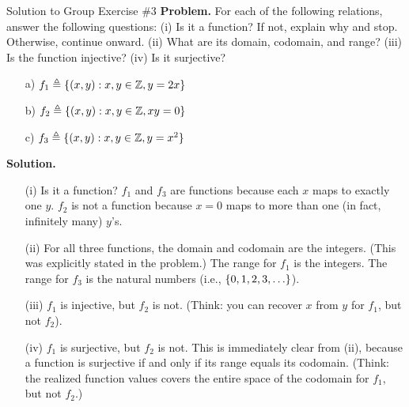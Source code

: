 \documentclass[10pt]{beamer}
\begin{document}
\begin{frame}{Solution to Group Exercise \#3}
\footnotesize 
\textbf{Problem.} For each of the following relations, answer the following questions:
	(i) Is it a function? If not, explain why and stop. Otherwise, continue onward.
	(ii) What are its domain, codomain, and range?
	(iii) Is the function injective? 
	(iv) Is it surjective?
	\begin{itemize}
	\item[a)] $f_1 \triangleq \{ {(x,y): x,y \in \mathbb{Z}, y=2x} \}$
	\item[b)] $f_2 \triangleq \{ {(x,y): x,y \in \mathbb{Z}, xy=0} \}$
	\item[c)] $f_3 \triangleq \{ {(x,y): x,y \in \mathbb{Z}, y=x^2} \}$
	\end{itemize}
\vfill 
\textbf{Solution.}
\begin{itemize}
\item[(i)] Is it a function? $f_1$ and $f_3$ are functions because each $x$ maps to exactly one $y$.  $f_2$ is not a function because $x=0$ maps to more than one (in fact, infinitely many) $y$'s.
\item[(ii)] For all three functions, the domain and codomain are the integers. (This was explicitly stated in the problem.) The range for $f_1$ is the integers. The range for $f_3$ is the natural numbers (i.e., $\{ {0,1,2,3,\hdots} \}$).  
\item[(iii)] $f_1$ is injective, but $f_2$ is not.  (Think: you can recover $x$ from $y$ for $f_1$, but not $f_2$).  
\item[(iv)] $f_1$ is surjective, but $f_2$ is not.  This is immediately clear from (ii), because a function is surjective if and only if its range equals its codomain. (Think: the realized function values covers the entire space of the codomain for $f_1$, but not $f_2$.)  
\end{itemize}


\end{frame}
\end{document}

